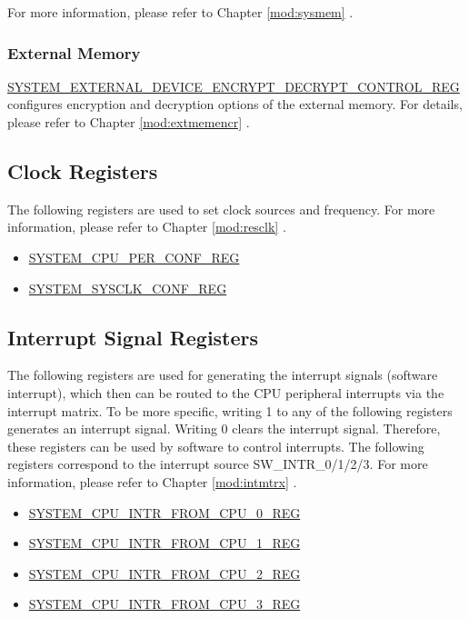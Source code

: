 \documentclass[main\_\_EN.tex]{subfiles}
\begin{document}
For more information, please refer to Chapter \ref{mod:sysmem} \textit{}.

\subsubsection{External Memory}

\hyperref[regdesc:SYSTEMEXTERNALDEVICEENCRYPTDECRYPTCONTROLREG]{SYSTEM\_EXTERNAL\_DEVICE\_ENCRYPT\_DECRYPT\_CONTROL\_REG} configures encryption and decryption options of the external memory. For details, please refer to Chapter \ref{mod:extmemencr}
\textit{}.




\subsection{Clock Registers}

The following registers are used to set clock sources and frequency. For more information, please refer to Chapter \ref{mod:resclk}
\textit{}.

\begin{itemize}
    \item \hyperref[regdesc:SYSTEMCPUPERCONFREG]{SYSTEM\_CPU\_PER\_CONF\_REG}
    \item \hyperref[regdesc:SYSTEMSYSCLKCONFREG]{SYSTEM\_SYSCLK\_CONF\_REG}
\end{itemize}

\subsection{Interrupt Signal Registers}

The following registers are used for generating the interrupt signals (software interrupt), which then can be routed to the CPU peripheral interrupts via the interrupt matrix. To be more specific, writing 1 to any of the following registers generates an interrupt signal. Writing 0 clears the interrupt signal. Therefore, these registers can be used by software to control interrupts. The following registers correspond to the interrupt source SW\_INTR\_0/1/2/3. For more information, please refer to Chapter \ref{mod:intmtrx}
\textit{}.

\begin{itemize}
    \item \hyperref[regdesc:SYSTEMCPUINTRFROMCPU0REG]{SYSTEM\_CPU\_INTR\_FROM\_CPU\_0\_REG}
    \item \hyperref[regdesc:SYSTEMCPUINTRFROMCPU1REG]{SYSTEM\_CPU\_INTR\_FROM\_CPU\_1\_REG}
    \item \hyperref[regdesc:SYSTEMCPUINTRFROMCPU2REG]{SYSTEM\_CPU\_INTR\_FROM\_CPU\_2\_REG}
    \item \hyperref[regdesc:SYSTEMCPUINTRFROMCPU3REG]{SYSTEM\_CPU\_INTR\_FROM\_CPU\_3\_REG}
\end{itemize}
\end{document}
